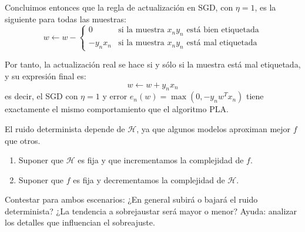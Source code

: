 \documentclass[a4paper, 11pt]{article}
\begin{document}
\begin{solucion}
        Concluimos entonces que la regla de actualización en SGD, con $\eta = 1$, es la siguiente para todas las muestras:
        \[
        w \gets w - \begin{cases}
            0 &\textrm{si la muestra } x_n y_n \textrm{ está bien etiquetada} \\
            -y_n x_n &\textrm{si la muestra } x_n y_n \textrm{ está mal etiquetada}
        \end{cases}
        \]

        Por tanto, la actualización real se hace si y sólo si la muestra está mal etiquetada, y su expresión final es:
        \[
        w \gets w + y_nx_n
        \]
        es decir, el SGD con $\eta = 1$ y error $e_n(w)=\max(0,-y_nw^Tx_n)$ tiene exactamente el mismo comportamiento que el algoritmo PLA.
      \end{solucion}

      \begin{ejercicio}
        El ruido determinista depende de $\mathcal{H}$, ya que algunos modelos aproximan mejor $f$ que otros.
        \begin{enumerate}
            \item Suponer que $\mathcal{H}$ es fija y que incrementamos la complejidad de $f$.
            \item Suponer que $f$ es fija y decrementamos la complejidad de $\mathcal{H}$.
        \end{enumerate}
        Contestar para ambos escenarios: ¿En general subirá o bajará el ruido determinista? ¿La tendencia a sobrejaustar será mayor o menor? Ayuda: analizar los detalles que influencian el sobreajuste.
      \end{ejercicio}
\end{document}
